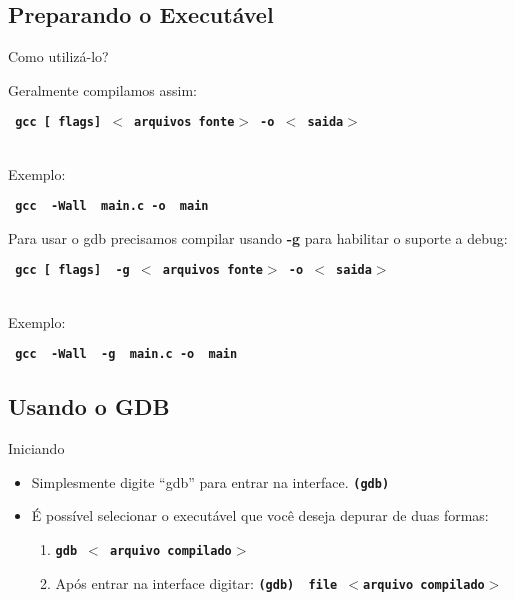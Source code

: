 \subsection{ Preparando o Executável }
\frame{\tableofcontents[
    currentsection,
    currentsubsection,
    subsectionstyle=show/shaded/hide
]}
\begin{frame}[fragile]{Como utilizá-lo?}

Geralmente compilamos assim:

\begin{center}
    \small
    \texttt{ \textbf{ gcc [{\color{blue} flags}]  $<${\color{dartmouthgreen} arquivos fonte}$>$ -o $<${\color{dartmouthgreen} saida}$>$}}
\end{center}
\\[2.0em]
Exemplo:
\begin{center}
    \small
    \texttt{ \textbf{ gcc {\color{blue} -Wall}  {\color{dartmouthgreen} main.c} -o {\color{dartmouthgreen} main} }}
\end{center}

Para usar o gdb precisamos compilar usando {\color{red} \textbf{-g}} para habilitar o suporte a debug:

\begin{center}
    \small
    \texttt{ \textbf{ gcc [{\color{blue} flags}] {\color{red} -g} $<${\color{dartmouthgreen} arquivos fonte}$>$ -o $<${\color{dartmouthgreen} saida}$>$}}
\end{center}
\\[2.0em]
Exemplo:
\begin{center}
    \small
    \texttt{ \textbf{ gcc {\color{blue} -Wall}  {\color{red} -g}  {\color{dartmouthgreen} main.c} -o {\color{dartmouthgreen} main} }}
\end{center}

\end{frame}

\subsection{ Usando o GDB }
\frame{\tableofcontents[
    currentsection,
    currentsubsection,
    subsectionstyle=show/shaded/hide
]}
\begin{frame}{Iniciando}
    \begin{itemize}
        \item Simplesmente digite ``gdb'' para entrar na interface. \texttt{\textbf{(gdb)}}
        \item É possível selecionar o executável que você deseja depurar de duas formas:
        \begin{enumerate}
            \item \textbf{ \texttt{gdb $<${\color{dartmouthgreen} arquivo compilado}$>$} }
            \item Após entrar na interface digitar: \textbf{\texttt{(gdb) {\color{blue} file} $<${\color{dartmouthgreen}arquivo compilado}$>$}}
        \end{enumerate}
    \end{itemize}
\end{frame}


